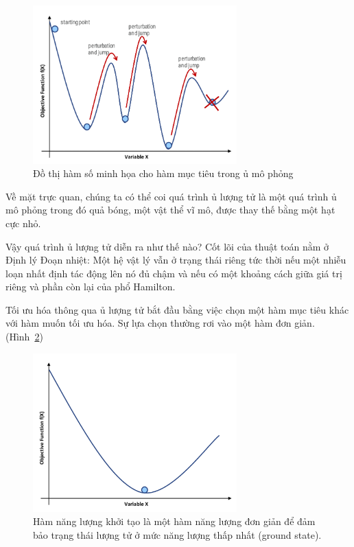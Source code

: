 \begin{figure}[h!]
    \centering
    \includegraphics[width=0.7\textwidth]{images/SA.png}
     \caption{Đồ thị hàm số minh họa cho hàm mục tiêu trong ủ mô phỏng}
     \label{fig:Quả bóng lăn dọc theo đồ thị hàm số}
\end{figure}

 Về mặt trực quan, chúng ta có thể coi quá trình ủ lượng tử là một quá trình ủ mô phỏng trong đó quả bóng, một vật thể vĩ mô, được thay thế bằng một hạt cực nhỏ. 

Vậy quá trình ủ lượng tử diễn ra như thế nào? Cốt lõi của thuật toán nằm ở Định lý Đoạn nhiệt: Một hệ vật lý vẫn ở trạng thái riêng tức thời nếu một nhiễu loạn nhất định tác động lên nó đủ chậm và nếu có một khoảng cách giữa giá trị riêng và phần còn lại của phổ Hamilton.

Tối ưu hóa thông qua ủ lượng tử bắt đầu bằng việc chọn một hàm mục tiêu khác với hàm muốn tối ưu hóa. Sự lựa chọn thường rơi vào một hàm đơn giản. (Hình~\ref{fig:Đồ thị hàm số một hàm đơn giản})

\begin{figure}[h!]
    \centering
    \includegraphics[width=0.7\textwidth]{images/simple_function.png}
    \caption{Hàm năng lượng khởi tạo là một hàm năng lượng đơn giản để đảm bảo trạng thái lượng tử ở mức năng lượng thấp nhất (ground state).}
    \label{fig:Đồ thị hàm số một hàm đơn giản}
\end{figure}

